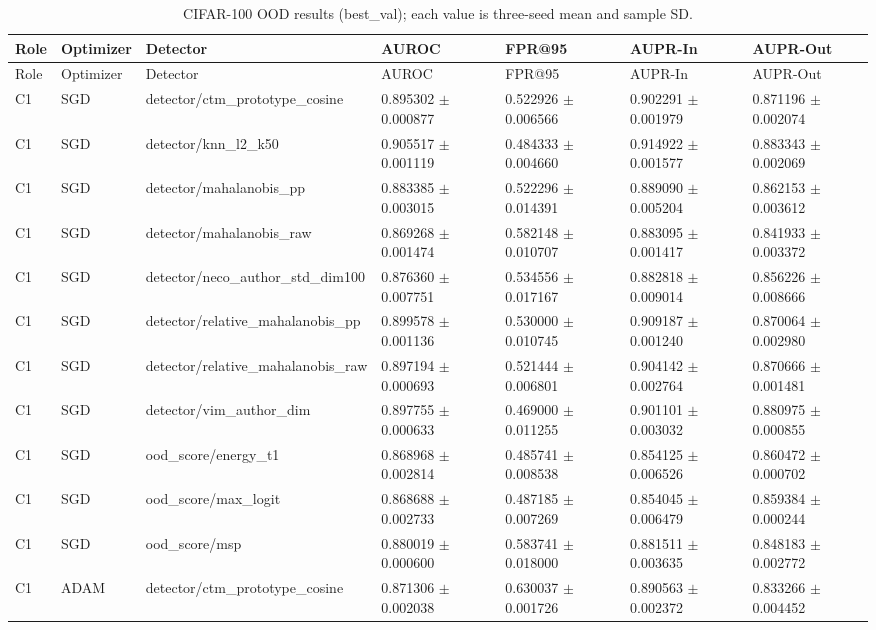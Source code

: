 \begin{longtable}{lllllll}
\caption{CIFAR-100 OOD results (best\_val); each value is three-seed mean and sample SD.}\\
Role & Optimizer & Detector & AUROC & FPR@95 & AUPR-In & AUPR-Out \\
\hline
\endfirsthead
Role & Optimizer & Detector & AUROC & FPR@95 & AUPR-In & AUPR-Out \\
\hline
\endhead
C1 & SGD & detector/ctm\_prototype\_cosine & 0.895302 $\pm$ 0.000877 & 0.522926 $\pm$ 0.006566 & 0.902291 $\pm$ 0.001979 & 0.871196 $\pm$ 0.002074 \\
C1 & SGD & detector/knn\_l2\_k50 & 0.905517 $\pm$ 0.001119 & 0.484333 $\pm$ 0.004660 & 0.914922 $\pm$ 0.001577 & 0.883343 $\pm$ 0.002069 \\
C1 & SGD & detector/mahalanobis\_pp & 0.883385 $\pm$ 0.003015 & 0.522296 $\pm$ 0.014391 & 0.889090 $\pm$ 0.005204 & 0.862153 $\pm$ 0.003612 \\
C1 & SGD & detector/mahalanobis\_raw & 0.869268 $\pm$ 0.001474 & 0.582148 $\pm$ 0.010707 & 0.883095 $\pm$ 0.001417 & 0.841933 $\pm$ 0.003372 \\
C1 & SGD & detector/neco\_author\_std\_dim100 & 0.876360 $\pm$ 0.007751 & 0.534556 $\pm$ 0.017167 & 0.882818 $\pm$ 0.009014 & 0.856226 $\pm$ 0.008666 \\
C1 & SGD & detector/relative\_mahalanobis\_pp & 0.899578 $\pm$ 0.001136 & 0.530000 $\pm$ 0.010745 & 0.909187 $\pm$ 0.001240 & 0.870064 $\pm$ 0.002980 \\
C1 & SGD & detector/relative\_mahalanobis\_raw & 0.897194 $\pm$ 0.000693 & 0.521444 $\pm$ 0.006801 & 0.904142 $\pm$ 0.002764 & 0.870666 $\pm$ 0.001481 \\
C1 & SGD & detector/vim\_author\_dim & 0.897755 $\pm$ 0.000633 & 0.469000 $\pm$ 0.011255 & 0.901101 $\pm$ 0.003032 & 0.880975 $\pm$ 0.000855 \\
C1 & SGD & ood\_score/energy\_t1 & 0.868968 $\pm$ 0.002814 & 0.485741 $\pm$ 0.008538 & 0.854125 $\pm$ 0.006526 & 0.860472 $\pm$ 0.000702 \\
C1 & SGD & ood\_score/max\_logit & 0.868688 $\pm$ 0.002733 & 0.487185 $\pm$ 0.007269 & 0.854045 $\pm$ 0.006479 & 0.859384 $\pm$ 0.000244 \\
C1 & SGD & ood\_score/msp & 0.880019 $\pm$ 0.000600 & 0.583741 $\pm$ 0.018000 & 0.881511 $\pm$ 0.003635 & 0.848183 $\pm$ 0.002772 \\
C1 & ADAM & detector/ctm\_prototype\_cosine & 0.871306 $\pm$ 0.002038 & 0.630037 $\pm$ 0.001726 & 0.890563 $\pm$ 0.002372 & 0.833266 $\pm$ 0.004452 \\

\end{longtable}
